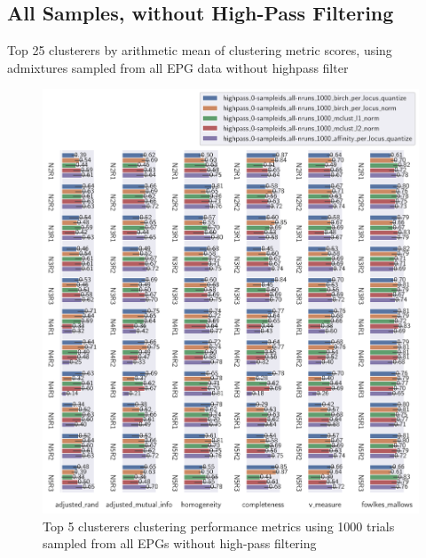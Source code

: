 \begin{theappendices}
\subsection{All Samples, without High-Pass Filtering}

\begin{table}[H]
\centering
{}
\caption{Top 25 clusterers by arithmetic mean of clustering metric scores, using admixtures sampled from all EPG data without highpass filter}
\label{table:top_25_not_ensemble_clusterers_by_metrics_highpass_0-sampleids_all-nruns_1000}
\end{table}

\begin{figure}[H]
\centering
\includegraphics[width=\textwidth]{./figures/clust_comparison/highpass_0-sampleids_all-nruns_1000_top_5_clusterers_by_metrics.pdf}
\caption{Top 5 clusterers clustering performance metrics using 1000 trials sampled from all EPGs without high-pass filtering}
\label{fig:highpass_0-sampleids_all-nruns_1000_top_5_clusterers_by_metrics}
\end{figure}


\end{theappendices}
